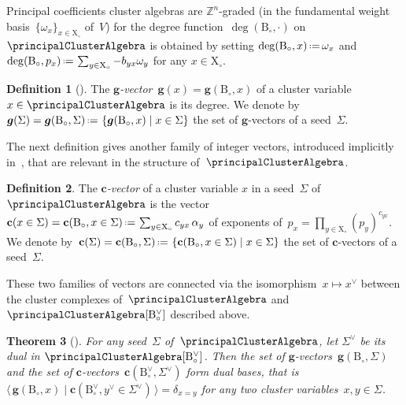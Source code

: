 \documentclass{amsart}
\newtheorem{theorem}{Theorem}[section]
\theoremstyle{definition}
\newtheorem{definition}[theorem]{Definition}
\newcommand{\Z}{\mathbb{Z}} %
\renewcommand{\b}[1]{{\boldsymbol{#1}}} %
\newcommand{\set}[2]{\left\{ #1 \;\middle|\; #2 \right\}} %
\newcommand{\bigdotprod}[2]{\big\langle \, #1 \; \big| \; #2 \, \big\rangle} %
\newcommand{\eqdef}{\mbox{\,\raisebox{0.2ex}{\scriptsize\ensuremath{\mathrm:}}\ensuremath{=}\,}} %
\newcommand{\darkblue}{\color{darkblue}} %
\newcommand{\defn}[1]{\textsl{\darkblue #1}} %
\newcommand{\gvector}[1]{\b{g}(#1)} %
\newcommand{\gvectorFull}[2]{\b{g}(#1,#2)} %
\newcommand{\gvectors}[1]{\b{g}(#1)} %
\newcommand{\cvector}[2]{\mathbf{c}(#2 \in #1)} %
\newcommand{\cvectorFull}[3]{\mathbf{c}(#1,#3 \in #2)} %
\newcommand{\cvectors}[1]{\mathbf{c}(#1)} %
\newcommand{\cvectorsFull}[2]{\mathbf{c}(#1,#2)} %
\newcommand{\seed}{\Sigma} %
\newcommand{\cluster}{\mathrm{X}} %
\newcommand{\B}{\mathrm{B}} %
\newcommand{\simpleRoot}{\alpha} %
\newcommand{\fundamentalWeight}{\omega} %
\begin{document}
Principal coefficients cluster algebras are $\Z^n$-graded (in the fundamental weight basis~$\{\omega_x\}_{x \in \cluster_\circ}$ of~$V$) for the degree function~$\deg(\B_\circ,\cdot)$ on $\principalClusterAlgebra$ is obtained by setting
\(
\deg(\B_\circ,  x) \eqdef \fundamentalWeight_x
\)
and
\(
\deg(\B_\circ, p_x) \eqdef \sum_{y \in \cluster_\circ} -b_{yx} \fundamentalWeight_y
\)
for any $x\in\cluster_\circ$.

\begin{definition}[\cite{FominZelevinsky-ClusterAlgebrasIV}]
The \defn{$\b{g}$-vector}~$\gvector{x} = \gvectorFull{\B_\circ}{x}$ of a cluster variable~$x \in \principalClusterAlgebra$ is its degree.
We denote by $\gvectors{\seed} = \gvectorFull{\B_\circ}{\seed} \eqdef \set{\gvectorFull{\B_\circ}{x}}{x \in \seed}$ the set of $\b{g}$-vectors of a seed~$\seed$.
\end{definition}

The next definition gives another family of integer vectors, introduced implicitly in~\cite{FominZelevinsky-ClusterAlgebrasIV}, that are relevant in the structure of~$\principalClusterAlgebra$.

\begin{definition}
The \defn{$\b{c}$-vector} of a cluster variable $x$ in a seed~$\seed$ of~$\principalClusterAlgebra$ is the vector
\(
\cvector{\seed}{x} = \cvectorFull{\B_\circ}{\seed}{x} \eqdef \sum_{y \in \cluster_\circ} c_{yx} \, \simpleRoot_y
\)
of exponents of~$p_x = \prod_{y \in \cluster_\circ} (p_y)^{c_{yx}}$.
We denote by~$\cvectors{\seed} = \cvectorsFull{\B_\circ}{\seed} \eqdef \set{\cvectorFull{\B_\circ}{\seed}{x}}{x \in \seed}$ the set of $\b{c}$-vectors of a seed~$\seed$.
\end{definition}

These two families of vectors are connected via the isomorphism~$x \mapsto x^\vee$ between the cluster complexes of~$\principalClusterAlgebra$ and~$\principalClusterAlgebra[\B_\circ^\vee]$ described above.

\begin{theorem}[{\cite[Thm~1.2]{NakanishiZelevinsky}}]
\label{prop:gvectorscvectorsDualBasesCA}
For any seed~$\seed$ of~$\principalClusterAlgebra$, let $\seed^\vee$ be its dual in $\principalClusterAlgebra[\B_\circ^\vee]$.
Then the set of $\b{g}$-vectors~$\gvectorFull{\B_\circ}{\seed}$ and the set of $\b{c}$-vectors~$\cvectorsFull{\B_\circ^\vee}{\seed^\vee}$ form dual bases, that is
\(
{\bigdotprod{\gvectorFull{\B_\circ}{x}}{\cvectorFull{\B_\circ^\vee}{\seed^\vee}{y^\vee}} = \delta_{x=y}}
\)
for any two cluster variables~$x,y \in \seed$.
\end{theorem}
\end{document}
